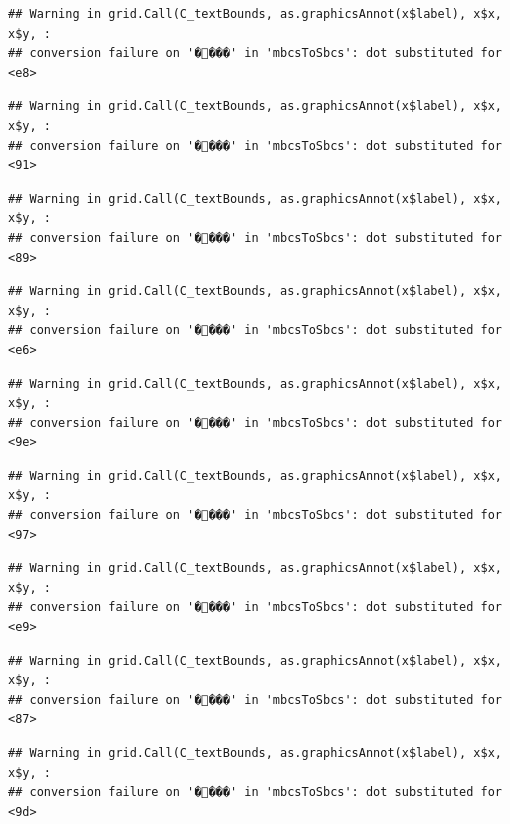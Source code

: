 \documentclass[
]{article}
\begin{document}
\begin{verbatim}
## Warning in grid.Call(C_textBounds, as.graphicsAnnot(x$label), x$x, x$y, :
## conversion failure on '����' in 'mbcsToSbcs': dot substituted for <e8>
\end{verbatim}

\begin{verbatim}
## Warning in grid.Call(C_textBounds, as.graphicsAnnot(x$label), x$x, x$y, :
## conversion failure on '����' in 'mbcsToSbcs': dot substituted for <91>
\end{verbatim}

\begin{verbatim}
## Warning in grid.Call(C_textBounds, as.graphicsAnnot(x$label), x$x, x$y, :
## conversion failure on '����' in 'mbcsToSbcs': dot substituted for <89>
\end{verbatim}

\begin{verbatim}
## Warning in grid.Call(C_textBounds, as.graphicsAnnot(x$label), x$x, x$y, :
## conversion failure on '����' in 'mbcsToSbcs': dot substituted for <e6>
\end{verbatim}

\begin{verbatim}
## Warning in grid.Call(C_textBounds, as.graphicsAnnot(x$label), x$x, x$y, :
## conversion failure on '����' in 'mbcsToSbcs': dot substituted for <9e>
\end{verbatim}

\begin{verbatim}
## Warning in grid.Call(C_textBounds, as.graphicsAnnot(x$label), x$x, x$y, :
## conversion failure on '����' in 'mbcsToSbcs': dot substituted for <97>
\end{verbatim}

\begin{verbatim}
## Warning in grid.Call(C_textBounds, as.graphicsAnnot(x$label), x$x, x$y, :
## conversion failure on '����' in 'mbcsToSbcs': dot substituted for <e9>
\end{verbatim}

\begin{verbatim}
## Warning in grid.Call(C_textBounds, as.graphicsAnnot(x$label), x$x, x$y, :
## conversion failure on '����' in 'mbcsToSbcs': dot substituted for <87>
\end{verbatim}

\begin{verbatim}
## Warning in grid.Call(C_textBounds, as.graphicsAnnot(x$label), x$x, x$y, :
## conversion failure on '����' in 'mbcsToSbcs': dot substituted for <9d>
\end{verbatim}
\end{document}

